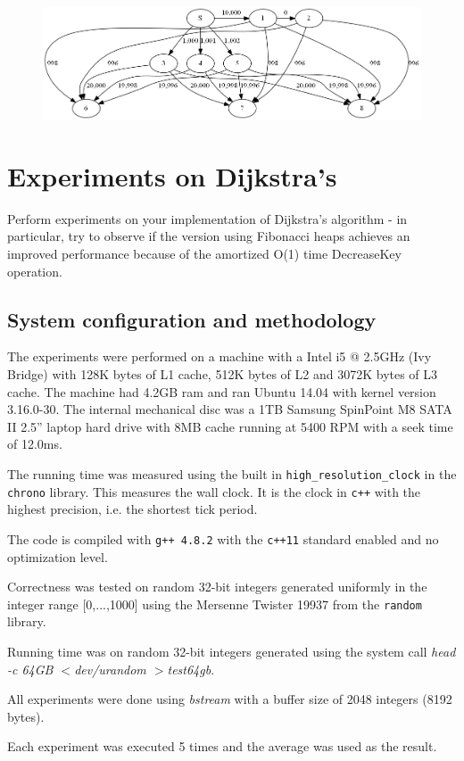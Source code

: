 \documentclass[a4paper,oneside,article,11pt]{memoir}
\begin{document}
\begin{figure}
\centering
\centerline {
\includegraphics[scale=0.5]{../figures/graph_positive_weights.png}
}
\caption{}
\label{figure:graph_neg_weights}
\end{figure}

\chapter{Experiments on Dijkstra's}
Perform experiments on your implementation of Dijkstra's algorithm - in particular, try to observe if the version using Fibonacci heaps achieves an improved performance because of the amortized O(1) time DecreaseKey operation.

\section{System configuration and methodology}
\label{sec:machine}
The experiments were performed on a machine with a Intel i5 @ 2.5GHz (Ivy Bridge) with 128K bytes of L1 cache, 512K bytes of L2 and 3072K bytes of L3 cache. The machine had 4.2GB ram and ran Ubuntu 14.04 with kernel version 3.16.0-30. The internal mechanical disc was a 1TB Samsung SpinPoint M8 SATA II 2.5'' laptop hard drive with 8MB cache running at 5400 RPM with a seek time of 12.0ms.

The running time was measured using the built in \texttt{high\_resolution\_clock} in the \texttt{chrono} library. This measures the wall clock. It is the clock in \texttt{c++} with the highest precision, i.e. the shortest tick period.

The code is compiled with \texttt{g++ 4.8.2} with the \texttt{c++11} standard enabled and no optimization level.

Correctness was tested on random 32-bit integers generated uniformly in the integer range [0,...,1000] using the Mersenne Twister 19937 from the \texttt{random} library.

Running time was on random 32-bit integers generated using the system call \textit{head -c 64GB $<$dev/urandom $>$test64gb}.

All experiments were done using \textit{bstream} with a buffer size of 2048 integers (8192 bytes).

Each experiment was executed 5 times and the average was used as the result.



\end{document}
